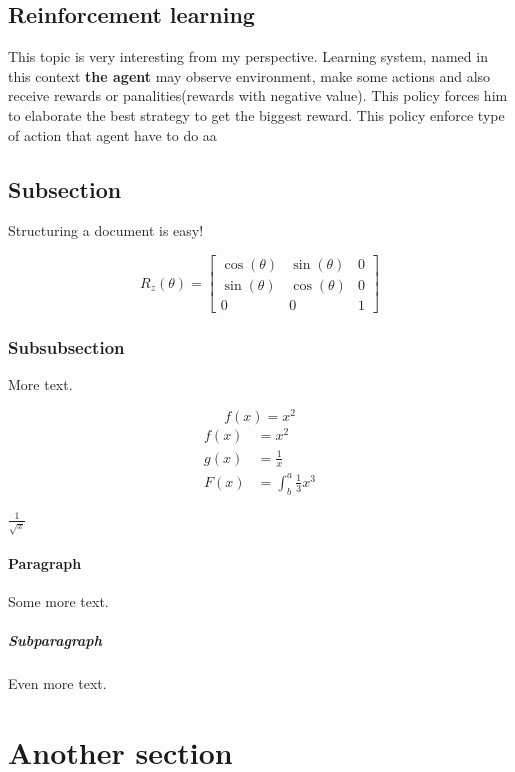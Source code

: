 \documentclass{article}
\begin{document}
   \newpage

  \subsection{Reinforcement learning}
  This topic is very interesting from my perspective. Learning system, named in this context \textbf{the agent} may observe environment, make some actions and also receive rewards or panalities(rewards with negative value). This policy forces him to elaborate the best strategy to get the biggest reward. This policy enforce type of action that agent have to do aa

  \newpage

\subsection{Subsection}



Structuring a document is easy!

\[    %
R_z (\theta)=
\begin{bmatrix}
    \cos(\theta) & \sin(\theta)  & 0 \\
    \sin(\theta) &  \cos(\theta)  & 0 \\
    0            & 0             & 1
\end{bmatrix}
\]    %

\subsubsection{Subsubsection}

More text.

\begin{equation*}
  f(x) = x^2
\end{equation*}
\begin{align*}
  f(x) &= x^2\\
  g(x) &= \frac{1}{x}\\
  F(x) &= \int^a_b \frac{1}{3}x^3
\end{align*}

\(\frac{1}{\sqrt{x}}\)

\paragraph{Paragraph}

Some more text.

\subparagraph{Subparagraph}

Even more text.

\section{Another section}
\end{document}
